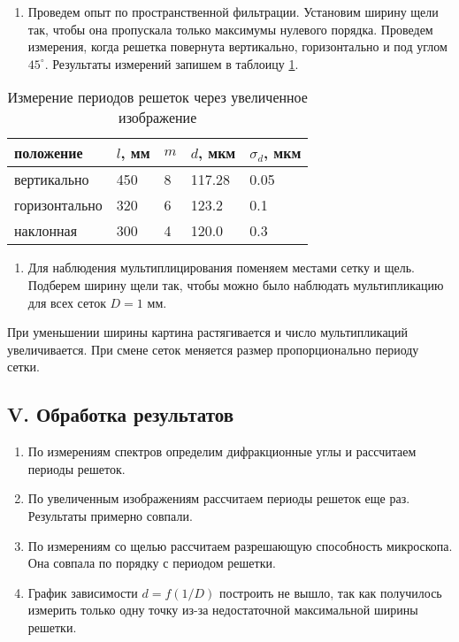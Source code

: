 \documentclass[a4paper,12pt]{article}
\begin{document}
\begin{enumerate}[resume]
    \item Проведем опыт по пространственной фильтрации. Установим ширину щели так, чтобы она пропускала только максимумы нулевого порядка. Проведем измерения, когда решетка повернута вертикально, горизонтально и под углом $45^\circ$. Результаты измерений запишем в таблоицу \ref{table:4}.
\end{enumerate}

\begin{table}[!ht]
    \centering
    \caption{Измерение периодов решеток через увеличенное изображение}
    \begin{tabular}{|l|l|l|l|l|}
        \hline
        положение & $l$, мм & $m$ & $d$, мкм & $\sigma_d$, мкм \\ \hline
        вертикально & 450 & 8 & 117.28 & 0.05 \\ \hline
        горизонтально & 320 & 6 & 123.2 & 0.1 \\ \hline
        наклонная & 300 & 4 & 120.0 & 0.3 \\ \hline
    \end{tabular}
    \label{table:4}
\end{table}

\begin{enumerate}[resume]
    \item Для наблюдения мультиплицирования поменяем местами сетку и щель. Подберем ширину щели так, чтобы можно было наблюдать мультипликацию для всех сеток $D = 1$ мм.
\end{enumerate}

При уменьшении ширины картина растягивается и число мультипликаций увеличивается. При смене сеток меняется размер пропорционально периоду сетки.

\newpage
\subsection*{V. Обработка результатов}

\begin{enumerate}
    \item По измерениям спектров определим дифракционные углы и рассчитаем периоды решеток.
    \item По увеличенным изображениям рассчитаем периоды решеток еще раз. Результаты примерно совпали.
    \item По измерениям со щелью рассчитаем разрешающую способность микроскопа. Она совпала по порядку с периодом решетки.
    \item График зависимости $d = f(1/D)$ построить не вышло, так как получилось измерить только одну точку из-за недостаточной максимальной ширины решетки.
\end{enumerate}
\end{document}
